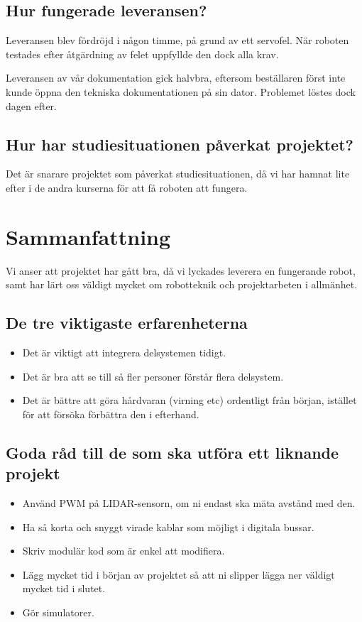 \documentclass[a4paper,titlepage,12pt]{article}
\begin{document}
	\subsection{Hur fungerade leveransen?}
    Leveransen blev fördröjd i någon timme, på grund av ett servofel. När
    roboten testades efter åtgärdning av felet uppfyllde den dock alla krav.

    Leveransen av vår dokumentation gick halvbra, eftersom beställaren först
    inte kunde öppna den tekniska dokumentationen på sin dator. Problemet
    löstes dock dagen efter.
	
	\subsection{Hur har studiesituationen påverkat projektet?}
    Det är snarare projektet som påverkat studiesituationen, då vi har hamnat
    lite efter i de andra kurserna för att få roboten att fungera.
	
	\section{Sammanfattning}
    Vi anser att projektet har gått bra, då vi lyckades leverera en fungerande
    robot, samt har lärt oss väldigt mycket om robotteknik och projektarbeten i
    allmänhet.
	
	\subsection{De tre viktigaste erfarenheterna}
    \begin{itemize}
        \item Det är viktigt att integrera delsystemen tidigt.
        \item Det är bra att se till så fler personer förstår flera delsystem.
        \item Det är bättre att göra hårdvaran (virning etc) ordentligt från början, istället
            för att försöka förbättra den i efterhand.
    \end{itemize}
	
	\subsection{Goda råd till de som ska utföra ett liknande projekt}
    \begin{itemize}
        \item Använd PWM på LIDAR-sensorn, om ni endast ska mäta avstånd med
            den.
        \item Ha så korta och snyggt virade kablar som möjligt i digitala
            bussar.
        \item Skriv modulär kod som är enkel att modifiera.
        \item Lägg mycket tid i början av projektet så att ni slipper lägga ner
            väldigt mycket tid i slutet.
        \item Gör simulatorer.
    \end{itemize}

	
\end{document}
